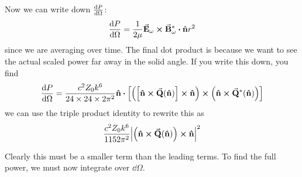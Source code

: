 \documentclass[a4paper,twoside,master.tex]{subfiles}
\begin{document}
Now we can write down $ \dv{P}{\Omega} $:
\begin{equation}
    \dv{P}{\Omega} = \frac{1}{2 \mu} \va{E}_{\omega} \cross \va{B}_{\omega}^* \vdot \vu{n} r^2
\end{equation}
since we are averaging over time. The final dot product is because we want to see the actual scaled power far away in the solid angle. If you write this down, you find
\begin{equation}
    \dv{P}{\Omega} = \frac{c^2 Z_0 k^6}{24 \times 24 \times 2 \pi^2} \vu{n} \vdot \left[ \left(\left[ \vu{n} \cross \va{Q}( \vu{n}) \right] \cross \vu{n}\right) \cross \left( \vu{n} \cross \va{Q}^*( \vu{n}) \right) \right]
\end{equation}
we can use the triple product identity to rewrite this as
\begin{equation}
    \frac{c^2 Z_0 k^6}{1152 \pi^2} \abs{\left( \vu{n} \cross \va{Q}( \vu{n}) \right) \cross \vu{n}}^2 
\end{equation}

Clearly this must be a smaller term than the leading terms. To find the full power, we must now integrate over $ \dd{\Omega} $.
\end{document}
